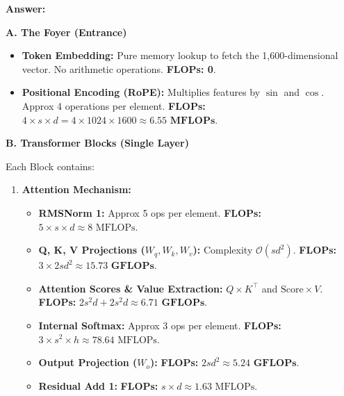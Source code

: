 \begin{answerbox}
    \textbf{Answer:}

    \textbf{A. The Foyer (Entrance)}
    \begin{itemize}[itemsep=0.5em, parsep=0pt, topsep=0.5em]
        \item \textbf{Token Embedding:} Pure memory lookup to fetch the 1,600-dimensional vector. No arithmetic operations. \textbf{FLOPs: 0}.
        \item \textbf{Positional Encoding (RoPE):} Multiplies features by $\sin$ and $\cos$. Approx 4 operations per element.
              \newline \textbf{FLOPs:} $4 \times s \times d = 4 \times 1024 \times 1600 \approx \mathbf{6.55 \text{ MFLOPs}}$.
    \end{itemize}

    \vspace{1em}
    \textbf{B. Transformer Blocks (Single Layer)}

    Each Block contains:
    \begin{enumerate}
        \item \textbf{Attention Mechanism:}
              \begin{itemize}[itemsep=0.2em, parsep=0pt, topsep=0.2em]
                  \item \textbf{RMSNorm 1:} Approx 5 ops per element. \textbf{FLOPs:} $5 \times s \times d \approx 8 \text{ MFLOPs}$.
                  \item \textbf{Q, K, V Projections ($W_q, W_k, W_v$):} Complexity $\mathcal{O}(sd^2)$. \newline \textbf{FLOPs:} $3 \times 2sd^2 \approx \mathbf{15.73 \text{ GFLOPs}}$.
                  \item \textbf{Attention Scores \& Value Extraction:} $Q \times K^\top$ and $\text{Score} \times V$. \newline \textbf{FLOPs:} $2s^2d + 2s^2d \approx \mathbf{6.71 \text{ GFLOPs}}$.
                  \item \textbf{Internal Softmax:} Approx 3 ops per element. \textbf{FLOPs:} $3 \times s^2 \times h \approx 78.64 \text{ MFLOPs}$.
                  \item \textbf{Output Projection ($W_o$):} \textbf{FLOPs:} $2sd^2 \approx \mathbf{5.24 \text{ GFLOPs}}$.
                  \item \textbf{Residual Add 1:} \textbf{FLOPs:} $s \times d \approx 1.63 \text{ MFLOPs}$.
              \end{itemize}


\end{enumerate}
\end{answerbox}
